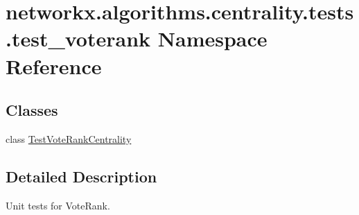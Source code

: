 \hypertarget{namespacenetworkx_1_1algorithms_1_1centrality_1_1tests_1_1test__voterank}{}\section{networkx.\+algorithms.\+centrality.\+tests.\+test\+\_\+voterank Namespace Reference}
\label{namespacenetworkx_1_1algorithms_1_1centrality_1_1tests_1_1test__voterank}
\subsection*{Classes}
\begin{DoxyCompactItemize}
\item 
class \hyperlink{classnetworkx_1_1algorithms_1_1centrality_1_1tests_1_1test__voterank_1_1TestVoteRankCentrality}{Test\+Vote\+Rank\+Centrality}
\end{DoxyCompactItemize}


\subsection{Detailed Description}
\begin{DoxyVerb}Unit tests for VoteRank.
\end{DoxyVerb}
 